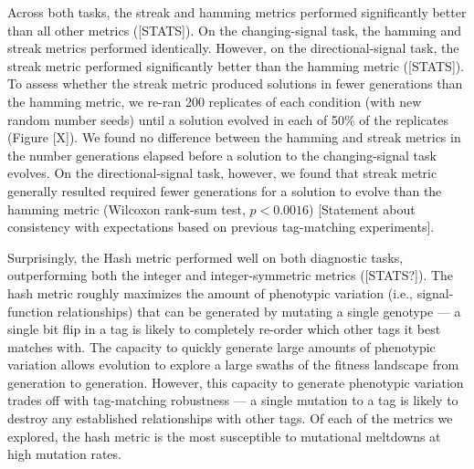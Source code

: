 Across both tasks, the streak and hamming metrics performed significantly better than all other metrics ([STATS]).
On the changing-signal task, the hamming and streak metrics performed identically.
However, on the directional-signal task, the streak metric performed significantly better than the hamming metric ([STATS]).
To assess whether the streak metric produced solutions in fewer generations than the hamming metric, we re-ran 200 replicates of each condition (with new random number seeds) until a solution evolved in each of 50\% of the replicates (Figure [X]).
We found no difference between the hamming and streak metrics in the number generations elapsed before a solution to the changing-signal task evolves.
On the directional-signal task, however, we found that streak metric generally resulted required fewer generations for a solution to evolve than the hamming metric (Wilcoxon rank-sum test, $p < 0.0016$)
[Statement about consistency with expectations based on previous tag-matching experiments].

Surprisingly, the Hash metric performed well on both diagnostic tasks, outperforming both the integer and integer-symmetric metrics ([STATS?]).
The hash metric roughly maximizes the amount of phenotypic variation (i.e., signal-function relationships) that can be generated by mutating a single genotype --- a single bit flip in a tag is likely to completely re-order which other tags it best matches with.
The capacity to quickly generate large amounts of phenotypic variation allows evolution to explore a large swaths of the fitness landscape from generation to generation.
However, this capacity to generate phenotypic variation trades off with tag-matching robustness --- a single mutation to a tag is likely to destroy any established relationships with other tags.
Of each of the metrics we explored, the hash metric is the most susceptible to mutational meltdowns at high mutation rates.





